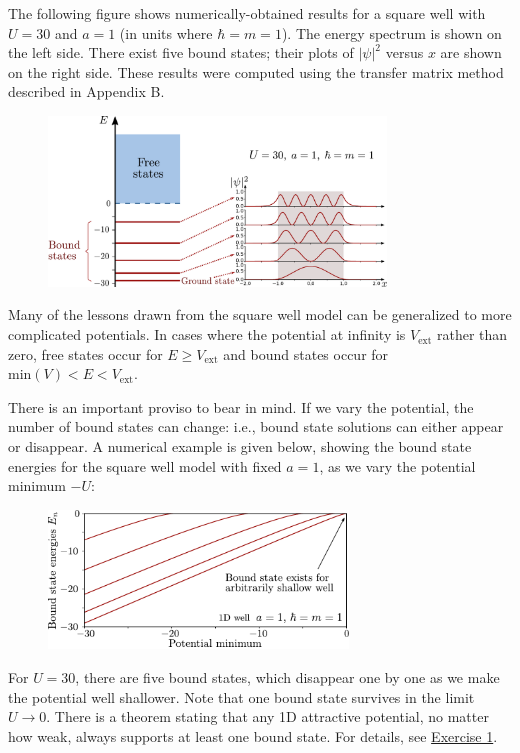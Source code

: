 \documentclass[pra,12pt]{revtex4}
\begin{document}
The following figure shows numerically-obtained results for a square
well with $U = 30$ and $a=1$ (in units where $\hbar = m =1$).  The
energy spectrum is shown on the left side.  There exist five bound
states; their plots of $|\psi|^2$ versus $x$ are shown on the right
side.  These results were computed using the transfer matrix method
described in Appendix B.

\begin{figure}[h]
  \centering\includegraphics[width=0.8\textwidth]{boundvsextended}
\end{figure}

Many of the lessons drawn from the square well model can be
generalized to more complicated potentials.  In cases where the
potential at infinity is $V_{\textrm{ext}}$ rather than zero, free
states occur for $E \ge V_{\textrm{ext}}$ and bound states occur for
$\textrm{min}(V) < E < V_{\textrm{ext}}$.

There is an important proviso to bear in mind.  If we vary the
potential, the number of bound states can change: i.e., bound state
solutions can either appear or disappear.  A numerical example is
given below, showing the bound state energies for the square well
model with fixed $a = 1$, as we vary the potential minimum $-U$:

\vskip 0.15in
\begin{figure}[h]
  \centering\includegraphics[width=0.71\textwidth]{boundstate1d}
\end{figure}

\noindent
For $U = 30$, there are five bound states, which disappear one by one
as we make the potential well shallower.  Note that one bound state
survives in the limit $U \rightarrow 0$.  There is a theorem stating
that any 1D attractive potential, no matter how weak, always supports
at least one bound state.  For details, see
\hyperref[ex:boundstate]{Exercise 1}.
\end{document}
